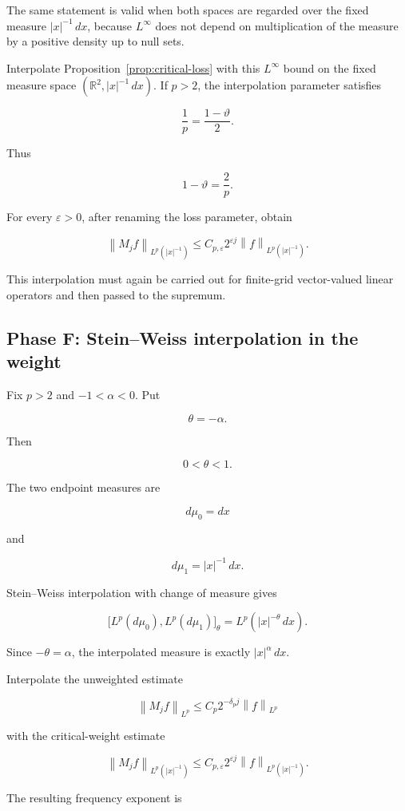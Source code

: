 \documentclass[11pt,a4paper]{article}
\theoremstyle{definition}
\theoremstyle{remark}
\newcommand{\R}{\mathbb{R}}
\newcommand{\norm}[1]{\left\lVert #1\right\rVert}
\newcommand{\abs}[1]{\left\lvert #1\right\rvert}
\begin{document}
The same statement is valid when both spaces are regarded over the fixed
measure $\abs{x}^{-1}\,dx$, because $L^\infty$ does not depend on multiplication
of the measure by a positive density up to null sets.

Interpolate Proposition~\ref{prop:critical-loss} with this $L^\infty$ bound on
the fixed measure space $(\R^2,\abs{x}^{-1}\,dx)$.  If $p>2$, the interpolation
parameter satisfies

\[
\frac{1}{p}=\frac{1-\vartheta}{2}.
\]

Thus

\[
1-\vartheta=\frac{2}{p}.
\]

For every $\varepsilon>0$, after renaming the loss parameter, obtain

\[
\norm{M_jf}_{L^p(\abs{x}^{-1})}
\leq C_{p,\varepsilon}2^{\varepsilon j}
\norm{f}_{L^p(\abs{x}^{-1})}.
\]

This interpolation must again be carried out for finite-grid vector-valued
linear operators and then passed to the supremum.

\subsection{Phase F: Stein--Weiss interpolation in the weight}

Fix $p>2$ and $-1<\alpha<0$.  Put

\[
\theta=-\alpha.
\]

Then

\[
0<\theta<1.
\]

The two endpoint measures are

\[
d\mu_0=dx
\]

and

\[
d\mu_1=\abs{x}^{-1}\,dx.
\]

Stein--Weiss interpolation with change of measure gives

\[
\bigl[L^p(d\mu_0),L^p(d\mu_1)\bigr]_\theta
=
L^p(\abs{x}^{-\theta}\,dx).
\]

Since $-\theta=\alpha$, the interpolated measure is exactly
$\abs{x}^{\alpha}\,dx$.

Interpolate the unweighted estimate

\[
\norm{M_jf}_{L^p}
\leq C_p2^{-\delta_pj}\norm{f}_{L^p}
\]

with the critical-weight estimate

\[
\norm{M_jf}_{L^p(\abs{x}^{-1})}
\leq C_{p,\varepsilon}2^{\varepsilon j}
\norm{f}_{L^p(\abs{x}^{-1})}.
\]

The resulting frequency exponent is
\end{document}
